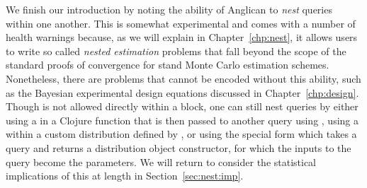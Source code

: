 We finish our introduction by noting the ability of Anglican to \emph{nest} queries within one another.  This
is somewhat experimental and comes with a number of health warnings because, as we will explain in Chapter~\ref{chp:nest},
it allows users to write so called \emph{nested estimation} problems that fall beyond the scope of the standard
proofs of convergence for stand Monte Carlo estimation schemes. Nonetheless, there are problems that cannot
be encoded without this ability, such as the Bayesian experimental design equations discussed in Chapter~\ref{chp:design}.
Though \doquery is not allowed directly within a  block, one can still nest queries by 
either using a \doquery in a Clojure function that is then passed to another query using {\small {}},
using a \doquery within a custom distribution defined by , or using the special form \conditional which
takes a query and returns a distribution object constructor, for which the inputs to the query become the parameters.
We will return to consider the statistical implications of this at length in Section~\ref{sec:nest:imp}.